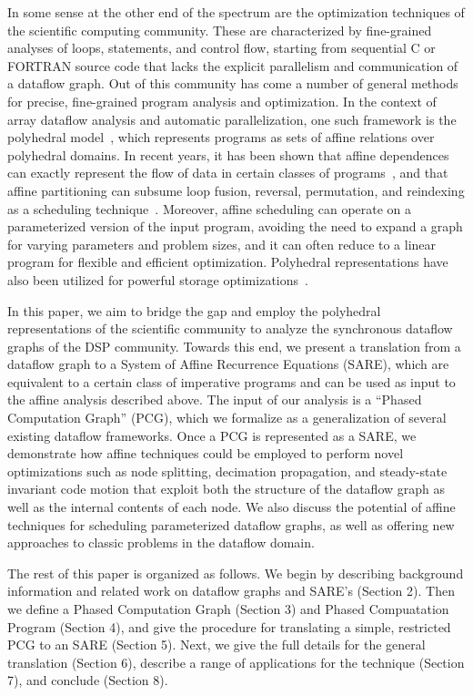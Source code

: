 In some sense at the other end of the spectrum are the optimization
techniques of the scientific computing community.  These are
characterized by fine-grained analyses of loops, statements, and
control flow, starting from sequential C or FORTRAN source code that
lacks the explicit parallelism and communication of a dataflow graph.
Out of this community has come a number of general methods for
precise, fine-grained program analysis and optimization.  In the
context of array dataflow analysis and automatic parallelization, one
such framework is the polyhedral model~\cite{DRV00}, which represents
programs as sets of affine relations over polyhedral domains. In
recent years, it has been shown that affine dependences can exactly
represent the flow of data in certain classes of
programs~\cite{Feautrier92i}, and that affine partitioning can subsume
loop fusion, reversal, permutation, and reindexing as a scheduling
technique~\cite{Lim98}.  Moreover, affine scheduling can operate on a
parameterized version of the input program, avoiding the need to
expand a graph for varying parameters and problem sizes, and it can
often reduce to a linear program for flexible and efficient
optimization.  Polyhedral representations have also been utilized for
powerful storage
optimizations~\cite{Lim01,Quillere,Thies01,Lefebvre98}.

In this paper, we aim to bridge the gap and employ the polyhedral
representations of the scientific community to analyze the synchronous
dataflow graphs of the DSP community.  Towards this end, we present a
translation from a dataflow graph to a System of Affine Recurrence
Equations (SARE), which are equivalent to a certain class of
imperative programs and can be used as input to the affine analysis
described above.  The input of our analysis is a ``Phased Computation
Graph'' (PCG), which we formalize as a generalization of several
existing dataflow frameworks.  Once a PCG is represented as a SARE, we
demonstrate how affine techniques could be employed to perform novel
optimizations such as node splitting, decimation propagation, and
steady-state invariant code motion that exploit both the structure of
the dataflow graph as well as the internal contents of each node.  We
also discuss the potential of affine techniques for scheduling
parameterized dataflow graphs, as well as offering new approaches to
classic problems in the dataflow domain.

The rest of this paper is organized as follows.  We begin by
describing background information and related work on dataflow graphs
and SARE's (Section 2).  Then we define a Phased Computation Graph
(Section 3) and Phased Compuatation Program (Section 4), and give the
procedure for translating a simple, restricted PCG to an SARE (Section
5).  Next, we give the full details for the general translation
(Section 6), describe a range of applications for the technique
(Section 7), and conclude (Section 8).
